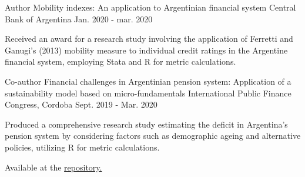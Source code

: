 

\begin{cventries}

  \cventry
    {Author} %
    {Mobility indexes: An application to Argentinian financial system} %
    {Central Bank of Argentina} %
    {Jan. 2020 - mar. 2020} %
    {
      \begin{cvitems} %
        \item {Received an award for a research study involving the application of Ferretti and Ganugi's (2013) mobility measure to individual credit ratings in the Argentine financial system, employing Stata and R for metric calculations.
        }
      \end{cvitems}
    }

  \cventry
     {Co-author} %
    {Financial challenges in Argentinian pension system: Application of a sustainability model based on micro-fundamentals} %
    {International Public Finance Congress, Cordoba} %
    {Sept. 2019 - Mar. 2020} %
    {
      \begin{cvitems} %
        \item {Produced a comprehensive research study estimating the deficit in Argentina's pension system by considering factors such as demographic ageing and alternative policies, utilizing R for metric calculations.}
      	\item{Available at the \href{http://jifp.eco.unc.edu.ar/images/TRABAJOS_52/trabajos53/20Paper_JIFP_Jubilaciones_2020.pdf}{repository.}}
	\end{cvitems}
    }
\end{cventries}
